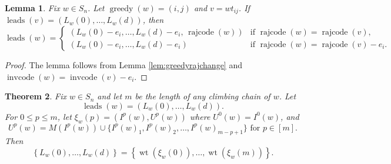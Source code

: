 \documentclass[11pt]{amsart}
\newtheorem{theorem}{Theorem}[section]
\newtheorem{lemma}[theorem]{Lemma}
\theoremstyle{definition}
\theoremstyle{named}
\DeclareMathOperator{\cc}{\mathrm{invcode}} %
\DeclareMathOperator{\rr}{\mathrm{rajcode}} %
\DeclareMathOperator{\greedy}{\mathrm{greedy}}
\DeclareMathOperator{\leads}{\mathrm{leads}}
\DeclareMathOperator{\wt}{\mathrm{wt}}
\begin{document}
	\begin{lemma}
		\label{lem:greedyleadsjchange}
		Fix $w\in S_n$. Let $\greedy(w)=(i,j)$ and $v=wt_{ij}$. If $\leads(v)=(L_w(0),\ldots,L_w(d))$, then
		\[\leads(w) = 
		\begin{cases}
		(L_w(0)-e_i,\ldots,L_w(d)-e_i,\,\rr(w)) &\mbox{if } \rr(w) = \rr(v),\\
		(L_w(0)-e_i,\ldots,L_w(d)-e_i) &\mbox{if } \rr(w) = \rr(v)-e_i.
		\end{cases} 
		\] 
	\end{lemma}
	\begin{proof}
		The lemma follows from Lemma \ref{lem:greedyrajchange} and $\cc(w)=\cc(v)-e_i$.	
	\end{proof}
	
	\begin{theorem}
		\label{thm:interpolatingchainsexponents}
		Fix $w\in S_n$ and let $m$ be the length of any climbing chain of $w$. Let
		\[\leads(w)=(L_w(0),\ldots,L_w(d)).\] 
		For $0\leq p\leq m$, let $\xi_w(p)=(I^p(w),U^p(w))$ where $U^0(w) = I^0(w)$, and
		\[U^p(w) = M(I^p(w))\cup \{I^p(w)_1,I^p(w)_2,\ldots,I^p(w)_{m-p+1} \}\mbox{ for } p\in [m].\]
		Then 
		\[\left\{{L_w(0)},\ldots, {L_w(d)}\right\} = \left\{\wt({\xi_w(0)}),\ldots,\wt({\xi_w(m)}) \right\}. \]
	\end{theorem}
\end{document}
